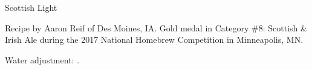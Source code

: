 \begin{recipe}{Scottish Light}

\begin{aboutblock}
Recipe by Aaron Reif of Des Moines, IA. Gold medal in Category \#8: Scottish \& Irish
Ale during the 2017 National Homebrew Competition in Minneapolis, MN.
\sourceaha
\end{aboutblock}


\begin{methodandtiming}

\begin{mashsteps}
\end{mashsteps}

\begin{fermentationsteps}
\end{fermentationsteps}

\begin{directions}
Water adjustment: .
\end{directions}

\end{methodandtiming}

\recipebreak

\begin{ingredientsblock}

\begin{malts}
\end{malts}

\begin{hops}
\end{hops}


\end{ingredientsblock}

\end{recipe}

